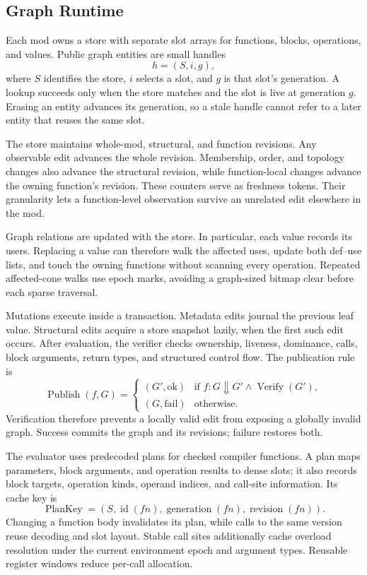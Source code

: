 \subsection{Graph Runtime}
\label{sec:graph-runtime}

Each mod owns a store with separate slot arrays for functions, blocks,
operations, and values. Public graph entities are small handles
\[
  h = (S, i, g),
\]
where $S$ identifies the store, $i$ selects a slot, and $g$ is that slot's
generation. A lookup succeeds only when the store matches and the slot is live
at generation $g$. Erasing an entity advances its generation, so a stale handle
cannot refer to a later entity that reuses the same slot.

The store maintains whole-mod, structural, and function revisions. Any
observable edit advances the whole revision. Membership, order, and topology
changes also advance the structural revision, while function-local changes
advance the owning function's revision. These counters serve as freshness
tokens. Their granularity lets a function-level
observation survive an unrelated edit elsewhere in the mod.

Graph relations are updated with the store. In particular, each value records
its users. Replacing a value can therefore walk the affected uses, update both
def--use lists, and touch the owning functions without scanning every operation.
Repeated affected-cone walks use epoch marks, avoiding a graph-sized bitmap
clear before each sparse traversal.

Mutations execute inside a transaction. Metadata edits journal the previous
leaf value. Structural edits acquire a store snapshot lazily, when the first
such edit occurs. After evaluation, the verifier checks ownership, liveness,
dominance, calls, block arguments, return types, and structured control flow.
The publication rule is
\[
  \operatorname{Publish}(f,G) =
  \begin{cases}
    (G', \mathrm{ok}) &
      \text{if } f:G \Downarrow G'
      \land \operatorname{Verify}(G'), \\
    (G, \mathrm{fail}) & \text{otherwise.}
  \end{cases}
\]
Verification therefore prevents a locally valid edit from exposing a globally
invalid graph. Success commits the graph and its revisions; failure restores
both.

The evaluator uses predecoded plans for checked compiler functions. A plan maps
parameters, block arguments, and operation results to dense slots; it
also records block targets, operation kinds, operand indices, and call-site
information. Its cache key is
\[
  \operatorname{PlanKey} =
  (S, \operatorname{id}(fn), \operatorname{generation}(fn),
   \operatorname{revision}(fn)).
\]
Changing a function body invalidates its plan, while calls to the same version
reuse decoding and slot layout. Stable call sites additionally cache overload
resolution under the current environment epoch and argument types. Reusable
register windows reduce per-call allocation.

